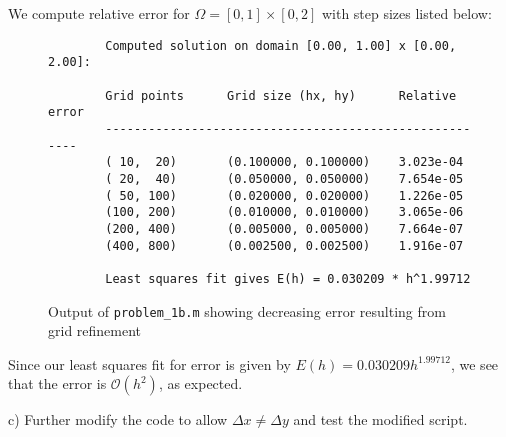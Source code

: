 \begin{solution}\ \\\\
    We compute relative error for $\Omega = [0, 1] \times [0, 2]$ with step sizes listed below:

    \begin{figure}[h]
        \begin{lstlisting}
        Computed solution on domain [0.00, 1.00] x [0.00, 2.00]: 
 
        Grid points      Grid size (hx, hy)      Relative error
        -------------------------------------------------------
        ( 10,  20)       (0.100000, 0.100000)    3.023e-04 
        ( 20,  40)       (0.050000, 0.050000)    7.654e-05 
        ( 50, 100)       (0.020000, 0.020000)    1.226e-05 
        (100, 200)       (0.010000, 0.010000)    3.065e-06 
        (200, 400)       (0.005000, 0.005000)    7.664e-07 
        (400, 800)       (0.002500, 0.002500)    1.916e-07 
             
        Least squares fit gives E(h) = 0.030209 * h^1.99712
        \end{lstlisting}
        \caption{Output of \texttt{problem\_1b.m} showing decreasing error resulting from grid refinement}
    \end{figure}

    Since our least squares fit for error is given by $E(h) = 0.030209 h^{1.99712}$, we see that the error is 
    $\mathcal{O}(h^2)$, as expected.
    \ \\
\end{solution}

\pagebreak
c) Further modify the code to allow $\Delta x \neq \Delta y$ and test the modified script.

